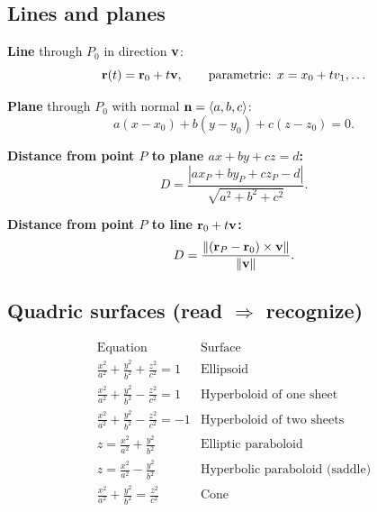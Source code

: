 \subsection{Lines and planes}
\textbf{Line} through $P_0$ in direction $\mathbf{v}$:
\[ \mathbf{r}(t) = \mathbf{r}_0 + t \mathbf{v}, \qquad \text{parametric: } x = x_0 + t v_1,\ldots \]

\textbf{Plane} through $P_0$ with normal $\mathbf{n} = \langle a, b, c \rangle$:
\[ a (x - x_0) + b (y - y_0) + c (z - z_0) = 0. \]

\textbf{Distance from point $P$ to plane $ax + by + cz = d$:}
\[ D = \frac{|a x_P + b y_P + c z_P - d|}{\sqrt{a^2 + b^2 + c^2}}. \]

\textbf{Distance from point $P$ to line $\mathbf{r}_0 + t \mathbf{v}$:}
\[ D = \frac{\lVert (\mathbf{r}_P - \mathbf{r}_0) \times \mathbf{v} \rVert}{\lVert \mathbf{v} \rVert}. \]

\subsection{Quadric surfaces (read $\Rightarrow$ recognize)}
\[
\renewcommand{\arraystretch}{1.3}
\begin{array}{l|l}
\text{Equation} & \text{Surface} \\\hline
\tfrac{x^2}{a^2} + \tfrac{y^2}{b^2} + \tfrac{z^2}{c^2} = 1 & \text{Ellipsoid} \\
\tfrac{x^2}{a^2} + \tfrac{y^2}{b^2} - \tfrac{z^2}{c^2} = 1 & \text{Hyperboloid of one sheet} \\
\tfrac{x^2}{a^2} + \tfrac{y^2}{b^2} - \tfrac{z^2}{c^2} = -1 & \text{Hyperboloid of two sheets} \\
z = \tfrac{x^2}{a^2} + \tfrac{y^2}{b^2} & \text{Elliptic paraboloid} \\
z = \tfrac{x^2}{a^2} - \tfrac{y^2}{b^2} & \text{Hyperbolic paraboloid (saddle)} \\
\tfrac{x^2}{a^2} + \tfrac{y^2}{b^2} = \tfrac{z^2}{c^2} & \text{Cone}
\end{array}
\]
